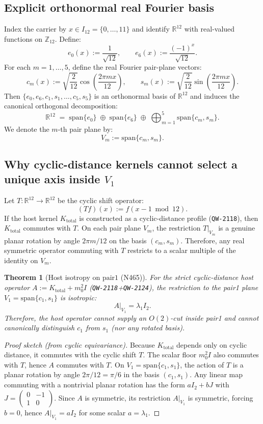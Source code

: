 \documentclass[11pt,a4paper]{article}
\newtheorem{theorem}{Theorem}[section]
\begin{document}
\subsection{Explicit orthonormal real Fourier basis}
Index the carrier by $x\in I_{12}=\{0,\dots,11\}$ and identify $\mathbb{R}^{12}$ with real-valued functions on $\mathbb{Z}_{12}$.
Define:
\[
e_0(x):=\frac{1}{\sqrt{12}},
\qquad
e_6(x):=\frac{(-1)^x}{\sqrt{12}}.
\]
For each $m=1,\dots,5$, define the real Fourier pair-plane vectors:
\[
c_m(x):=\sqrt{\frac{2}{12}}\cos\!\left(\frac{2\pi m x}{12}\right),
\qquad
s_m(x):=\sqrt{\frac{2}{12}}\sin\!\left(\frac{2\pi m x}{12}\right).
\]
Then $\{e_0,e_6,c_1,s_1,\dots,c_5,s_5\}$ is an orthonormal basis of $\mathbb{R}^{12}$ and induces the canonical orthogonal decomposition:
\[
\mathbb{R}^{12}
\;=\;
\mathrm{span}\{e_0\}
\;\oplus\;
\mathrm{span}\{e_6\}
\;\oplus\;
\bigoplus_{m=1}^{5}\mathrm{span}\{c_m,s_m\}.
\]
We denote the $m$-th pair plane by:
\[
V_m:=\mathrm{span}\{c_m,s_m\}.
\]

\subsection{Why cyclic-distance kernels cannot select a unique axis inside \texorpdfstring{$V_1$}{V1}}
Let $T:\mathbb{R}^{12}\to\mathbb{R}^{12}$ be the cyclic shift operator:
\[
(Tf)(x):=f(x-1\bmod 12).
\]
If the host kernel $K_{\mathrm{total}}$ is constructed as a cyclic-distance profile (\texttt{QW-2118}),
then $K_{\mathrm{total}}$ commutes with $T$.
On each pair plane $V_m$, the restriction $T|_{V_m}$ is a genuine planar rotation by angle $2\pi m/12$ on the basis $(c_m,s_m)$.
Therefore, any real symmetric operator commuting with $T$ restricts to a scalar multiple of the identity on $V_m$.

\begin{theorem}[Host isotropy on \texorpdfstring{$\mathrm{pair1}$}{pair1} (N465)]
For the strict cyclic-distance host operator $A:=K_{\mathrm{total}}+m_0^2 I$ (\texttt{QW-2118}+\texttt{QW-2124}), the restriction to the pair1 plane
$V_1=\mathrm{span}\{c_1,s_1\}$ is isotropic:
\[
A|_{V_1}=\lambda_1 I_2.
\]
Therefore, the host operator cannot supply an $O(2)$-cut inside pair1 and cannot canonically distinguish $c_1$ from $s_1$ (nor any rotated basis).
\end{theorem}

\begin{proof}[Proof sketch (from cyclic equivariance)]
Because $K_{\mathrm{total}}$ depends only on cyclic distance, it commutes with the cyclic shift $T$.
The scalar floor $m_0^2 I$ also commutes with $T$, hence $A$ commutes with $T$.
On $V_1=\mathrm{span}\{c_1,s_1\}$, the action of $T$ is a planar rotation by angle $2\pi/12=\pi/6$ in the basis $(c_1,s_1)$.
Any linear map commuting with a nontrivial planar rotation has the form $a I_2 + b J$ with $J=\begin{pmatrix}0&-1\\1&0\end{pmatrix}$.
Since $A$ is symmetric, its restriction $A|_{V_1}$ is symmetric, forcing $b=0$, hence $A|_{V_1}=a I_2$ for some scalar $a=\lambda_1$.
\end{proof}
\end{document}
